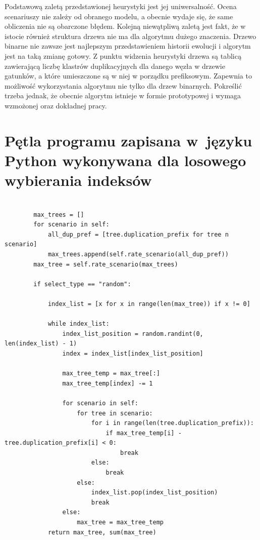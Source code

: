 \documentclass[licencjacka]{pracamgr}
\begin{document}
Podstawową zaletą przedstawionej heurystyki jest jej uniwersalność. Ocena scenariuszy nie zależy od obranego modelu, a obecnie wydaje się, że same obliczenia nie są obarczone błędem. Kolejną niewątpliwą zaletą jest fakt, że w istocie również struktura drzewa nie ma dla algorytmu dużego znaczenia. Drzewo binarne nie zawsze jest najlepszym przedstawieniem historii ewolucji i algorytm jest na taką zmianę gotowy. Z punktu widzenia heurystyki drzewa są tablicą zawierającą liczbę klastrów duplikacyjnych dla danego węzła w drzewie gatunków, a które umieszczone są w niej w porządku prefiksowym. Zapewnia to możliwość wykorzystania algorytmu nie tylko dla drzew binarnych. Pokreślić trzeba jednak, że obecnie algorytm istnieje w formie prototypowej i wymaga wzmożonej oraz dokładnej pracy.  

\appendix

\chapter{Pętla programu zapisana w~języku Python wykonywana dla losowego wybierania indeksów}

\begin{verbatim}

		max_trees = []
        for scenario in self:
            all_dup_pref = [tree.duplication_prefix for tree n scenario]
            max_trees.append(self.rate_scenario(all_dup_pref))
        max_tree = self.rate_scenario(max_trees)

        if select_type == "random":

            index_list = [x for x in range(len(max_tree)) if x != 0]

            while index_list:
                index_list_position = random.randint(0, len(index_list) - 1)
                index = index_list[index_list_position]

                max_tree_temp = max_tree[:]
                max_tree_temp[index] -= 1

                for scenario in self:
                    for tree in scenario:
                        for i in range(len(tree.duplication_prefix)):
                            if max_tree_temp[i] - tree.duplication_prefix[i] < 0:
                                break
                        else:
                            break
                    else:
                        index_list.pop(index_list_position)
                        break
                else:
                    max_tree = max_tree_temp
            return max_tree, sum(max_tree)
\end{verbatim}
\end{document}
